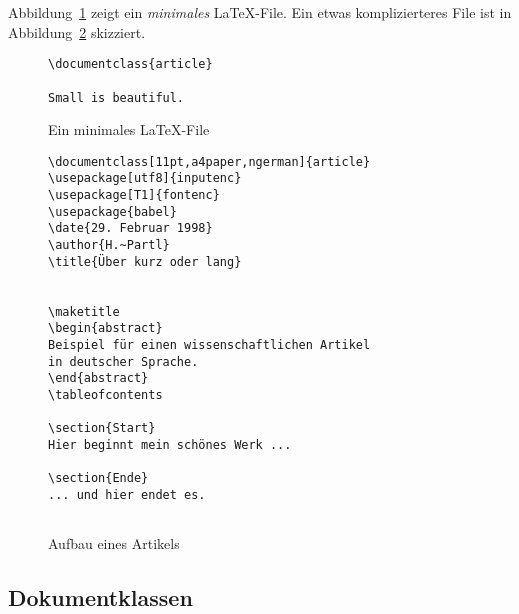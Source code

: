 Abbildung~\ref{mini} zeigt ein \emph{minimales} \LaTeX-File.
Ein etwas komplizierteres File ist in Abbildung~\ref{dokument}
skizziert.
 
\begin{figure}[hbp] %
\begin{lminipage}{6cm}
\begin{verbatim}
\documentclass{article}

Small is beautiful.

\end{verbatim}
\end{lminipage}
\caption{Ein minimales \LaTeX-File} \label{mini}
\end{figure}

\begin{figure}[hbtp] %
\begin{lminipage}{10cm}
\begin{verbatim}
\documentclass[11pt,a4paper,ngerman]{article}
\usepackage[utf8]{inputenc}
\usepackage[T1]{fontenc}
\usepackage{babel}
\date{29. Februar 1998}
\author{H.~Partl}
\title{Über kurz oder lang}


\maketitle
\begin{abstract}
Beispiel für einen wissenschaftlichen Artikel
in deutscher Sprache.
\end{abstract}
\tableofcontents

\section{Start}
Hier beginnt mein schönes Werk ...

\section{Ende}
... und hier endet es.


\end{verbatim}
\end{lminipage}
\caption{Aufbau eines Artikels} \label{dokument}
\end{figure}
 
 
\subsection{Dokumentklassen}\label{docsty}
 
